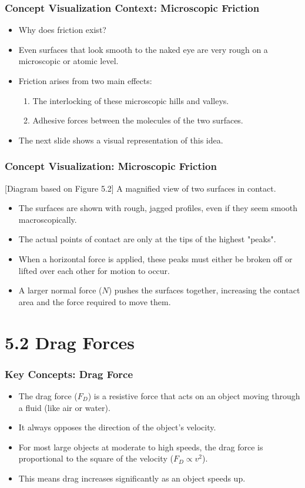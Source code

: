 \documentclass{beamer}
\begin{document}
\begin{frame}
\frametitle{Concept Visualization Context: Microscopic Friction}
\begin{itemize}
    \item Why does friction exist? \pause
    \item Even surfaces that look smooth to the naked eye are very rough on a microscopic or atomic level. \pause
    \item Friction arises from two main effects:
    \begin{enumerate}
        \item The interlocking of these microscopic hills and valleys. \pause
        \item Adhesive forces between the molecules of the two surfaces.
    \end{enumerate} \pause
    \item The next slide shows a visual representation of this idea.
\end{itemize}
\end{frame}

\begin{frame}
\frametitle{Concept Visualization: Microscopic Friction}
\begin{alertblock}{[Diagram based on Figure 5.2]}
A magnified view of two surfaces in contact.
\begin{itemize}
    \item The surfaces are shown with rough, jagged profiles, even if they seem smooth macroscopically.
    \item The actual points of contact are only at the tips of the highest "peaks".
    \item When a horizontal force is applied, these peaks must either be broken off or lifted over each other for motion to occur.
    \item A larger normal force ($N$) pushes the surfaces together, increasing the contact area and the force required to move them.
\end{itemize}
\end{alertblock}
\end{frame}

\section{5.2 Drag Forces}

\begin{frame}
\frametitle{Key Concepts: Drag Force}
\begin{itemize}
    \item The drag force ($F_D$) is a resistive force that acts on an object moving through a fluid (like air or water). \pause
    \item It always opposes the direction of the object's velocity. \pause
    \item For most large objects at moderate to high speeds, the drag force is proportional to the square of the velocity ($F_D \propto v^2$). \pause
    \item This means drag increases significantly as an object speeds up.
\end{itemize}
\end{frame}
\end{document}
